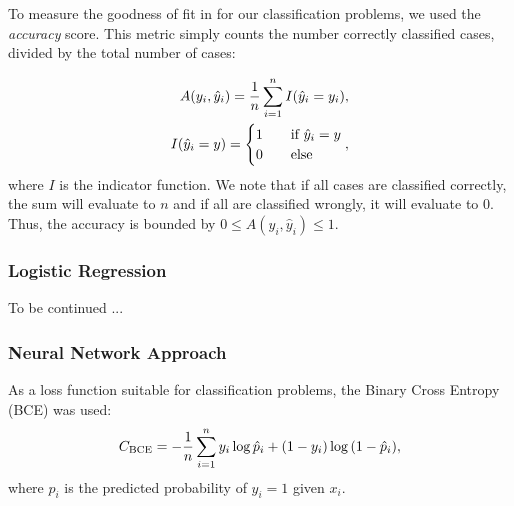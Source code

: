     To measure the goodness of fit in for our classification problems, we used the \textit{accuracy} score. This metric simply counts the number correctly classified cases, divided by the total number of cases:

    \begin{align}
        A(y_i, \hat{y}_i) = \frac{1}{n}\sum_{i=1}^{n} I(\hat{y}_i = y_i), \\
        I(\hat{y}_i = y) = \begin{cases}
            1\hspace{10px}&\text{if }\hat{y}_i = y \\
            0\hspace{10px}&\text{else}
        \end{cases} \nonumber,
    \end{align}
    where $I$ is the indicator function. We note that if all cases are classified correctly, the sum will evaluate to $n$ and if all are classified wrongly, it will evaluate to 0. Thus, the accuracy is bounded by $0 \leq A(y_i, \hat{y}_i) \leq 1$.

    \subsubsection{Logistic Regression}
    To be continued ...

    \subsubsection{Neural Network Approach}
    As a loss function suitable for classification problems, the Binary Cross Entropy (BCE) \cite{BCE} was used:
    \begin{align}
        {C}_\text{BCE} = -\frac{1}{n}\sum_{i=1}^{n} y_i \log{\hat{p}_i} + (1-y_i) \log{(1-\hat{p}_i)},
        \label{eq:BCE_loss_function}
    \end{align} 
    where $\hat{p}_i$ is the predicted probability of $y_i = 1$ given $x_i$.  